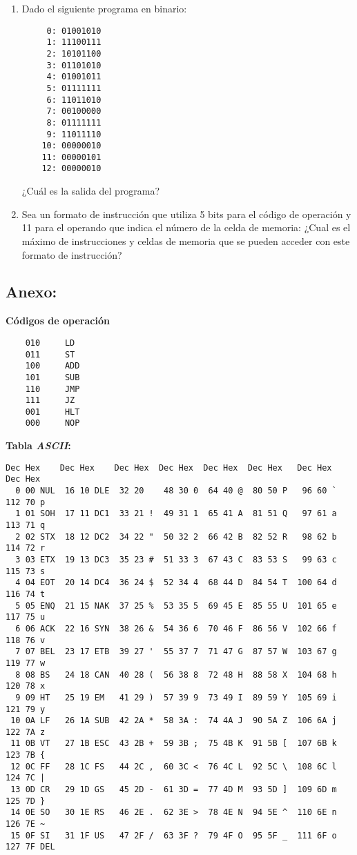 \documentclass[12pt]{article}
\begin{document}
\begin{enumerate}
\begin{enumerate}
        \end{enumerate}

    \item Dado el siguiente programa en binario:

        \begin{verbatim}
     0: 01001010
     1: 11100111
     2: 10101100
     3: 01101010
     4: 01001011
     5: 01111111
     6: 11011010
     7: 00100000
     8: 01111111
     9: 11011110
    10: 00000010
    11: 00000101
    12: 00000010
        \end{verbatim}

        ¿Cuál es la salida del programa?

    \item Sea un formato de instrucción que utiliza 5 bits para el código de
        operación y 11 para el operando que indica el número de la celda de
        memoria: ¿Cual es el máximo de instrucciones y celdas de memoria que
        se pueden acceder con este formato de instrucción?

\end{enumerate}

\subsection*{ \large\textbf{Anexo:} }

\textbf{Códigos de operación}

\begin{verbatim}
    010     LD
    011     ST
    100     ADD
    101     SUB
    110     JMP
    111     JZ
    001     HLT
    000     NOP
\end{verbatim}

\textbf{Tabla \emph{ASCII}:}

\begin{verbatim}
Dec Hex    Dec Hex    Dec Hex  Dec Hex  Dec Hex  Dec Hex   Dec Hex   Dec Hex
  0 00 NUL  16 10 DLE  32 20    48 30 0  64 40 @  80 50 P   96 60 `  112 70 p
  1 01 SOH  17 11 DC1  33 21 !  49 31 1  65 41 A  81 51 Q   97 61 a  113 71 q
  2 02 STX  18 12 DC2  34 22 "  50 32 2  66 42 B  82 52 R   98 62 b  114 72 r
  3 03 ETX  19 13 DC3  35 23 #  51 33 3  67 43 C  83 53 S   99 63 c  115 73 s
  4 04 EOT  20 14 DC4  36 24 $  52 34 4  68 44 D  84 54 T  100 64 d  116 74 t
  5 05 ENQ  21 15 NAK  37 25 %  53 35 5  69 45 E  85 55 U  101 65 e  117 75 u
  6 06 ACK  22 16 SYN  38 26 &  54 36 6  70 46 F  86 56 V  102 66 f  118 76 v
  7 07 BEL  23 17 ETB  39 27 '  55 37 7  71 47 G  87 57 W  103 67 g  119 77 w
  8 08 BS   24 18 CAN  40 28 (  56 38 8  72 48 H  88 58 X  104 68 h  120 78 x
  9 09 HT   25 19 EM   41 29 )  57 39 9  73 49 I  89 59 Y  105 69 i  121 79 y
 10 0A LF   26 1A SUB  42 2A *  58 3A :  74 4A J  90 5A Z  106 6A j  122 7A z
 11 0B VT   27 1B ESC  43 2B +  59 3B ;  75 4B K  91 5B [  107 6B k  123 7B {
 12 0C FF   28 1C FS   44 2C ,  60 3C <  76 4C L  92 5C \  108 6C l  124 7C |
 13 0D CR   29 1D GS   45 2D -  61 3D =  77 4D M  93 5D ]  109 6D m  125 7D }
 14 0E SO   30 1E RS   46 2E .  62 3E >  78 4E N  94 5E ^  110 6E n  126 7E ~
 15 0F SI   31 1F US   47 2F /  63 3F ?  79 4F O  95 5F _  111 6F o  127 7F DEL
\end{verbatim}
\end{document}
